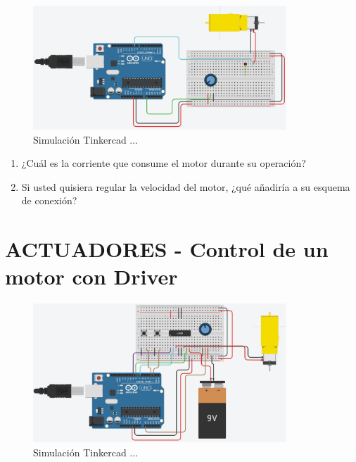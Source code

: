 \begin{figure}[H]
    \centering
    \includegraphics[width=0.85\textwidth]{./img/ckpt_encendido_motor.png}
    \caption{Simulación Tinkercad ...}
    \label{fig:encendido_motor}
\end{figure}


\begin{enumerate}
    \item ¿Cuál es la corriente que consume el motor durante su operación?
    \item Si usted quisiera regular la velocidad del motor, ¿qué añadiría a su esquema de conexión?
\end{enumerate}

\section{ACTUADORES - Control de un motor con Driver}


\begin{figure}[H]
    \centering
    \includegraphics[width=0.85\textwidth]{./img/ckpt_motor_driver.png}
    \caption{Simulación Tinkercad ...}
    \label{fig:motor_driver}
\end{figure}

